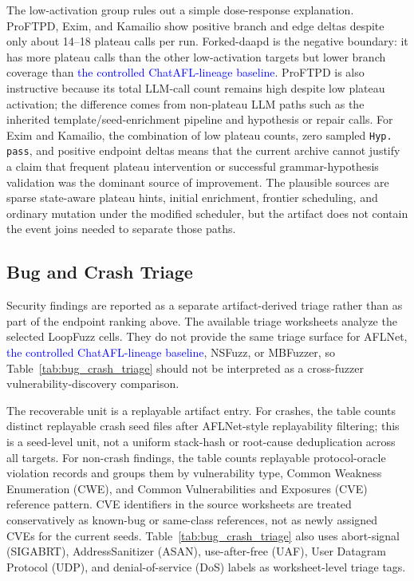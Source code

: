 \documentclass[final,5p,times,number]{elsarticle}
\begin{document}
The low-activation group rules out a simple dose-response explanation. ProFTPD, Exim, and Kamailio show positive branch and edge deltas despite only about 14--18 plateau calls per run. Forked-daapd is the negative boundary: it has more plateau calls than the other low-activation targets but lower branch coverage than \textcolor{blue}{the controlled ChatAFL-lineage baseline}. ProFTPD is also instructive because its total LLM-call count remains high despite low plateau activation; the difference comes from non-plateau LLM paths such as the inherited template/seed-enrichment pipeline and hypothesis or repair calls. For Exim and Kamailio, the combination of low plateau counts, zero sampled \texttt{Hyp. pass}, and positive endpoint deltas means that the current archive cannot justify a claim that frequent plateau intervention or successful grammar-hypothesis validation was the dominant source of improvement. The plausible sources are sparse state-aware plateau hints, initial enrichment, frontier scheduling, and ordinary mutation under the modified scheduler, but the artifact does not contain the event joins needed to separate those paths.

\subsection{Bug and Crash Triage}
\label{sec:bug_crash_triage}

Security findings are reported as a separate artifact-derived triage rather than as part of the endpoint ranking above. The available triage worksheets analyze the selected LoopFuzz cells. They do not provide the same triage surface for AFLNet, \textcolor{blue}{the controlled ChatAFL-lineage baseline}, NSFuzz, or MBFuzzer, so Table~\ref{tab:bug_crash_triage} should not be interpreted as a cross-fuzzer vulnerability-discovery comparison.

The recoverable unit is a replayable artifact entry. For crashes, the table counts distinct replayable crash seed files after AFLNet-style replayability filtering; this is a seed-level unit, not a uniform stack-hash or root-cause deduplication across all targets. For non-crash findings, the table counts replayable protocol-oracle violation records and groups them by vulnerability type, Common Weakness Enumeration (CWE), and Common Vulnerabilities and Exposures (CVE) reference pattern. CVE identifiers in the source worksheets are treated conservatively as known-bug or same-class references, not as newly assigned CVEs for the current seeds. Table~\ref{tab:bug_crash_triage} also uses abort-signal (SIGABRT), AddressSanitizer (ASAN), use-after-free (UAF), User Datagram Protocol (UDP), and denial-of-service (DoS) labels as worksheet-level triage tags.
\end{document}
